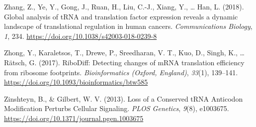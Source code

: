 \documentclass[12pt,openany]{book}
\begin{document}
\hypertarget{ref-Zhang2018}{}
Zhang, Z., Ye, Y., Gong, J., Ruan, H., Liu, C.-J., Xiang, Y., \ldots{}
Han, L. (2018). Global analysis of tRNA and translation factor
expression reveals a dynamic landscape of translational regulation in
human cancers. \emph{Communications Biology}, \emph{1}, 234.
\url{https://doi.org/10.1038/s42003-018-0239-8}

\hypertarget{ref-Zhong2017}{}
Zhong, Y., Karaletsos, T., Drewe, P., Sreedharan, V. T., Kuo, D., Singh,
K., \ldots{} Rätsch, G. (2017). RiboDiff: Detecting changes of mRNA
translation efficiency from ribosome footprints. \emph{Bioinformatics
(Oxford, England)}, \emph{33}(1), 139--141.
\url{https://doi.org/10.1093/bioinformatics/btw585}

\hypertarget{ref-Zinshteyn2013}{}
Zinshteyn, B., \& Gilbert, W. V. (2013). Loss of a Conserved tRNA
Anticodon Modification Perturbs Cellular Signaling. \emph{PLOS
Genetics}, \emph{9}(8), e1003675.
\url{https://doi.org/10.1371/journal.pgen.1003675}
\end{document}

